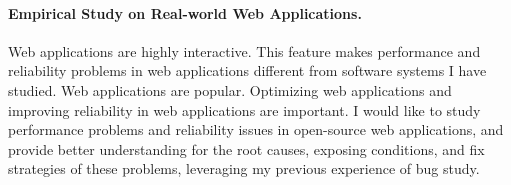 \documentclass[10pt]{article}
\begin{document}
\paragraph{Empirical Study on Real-world Web Applications.}
Web applications are highly interactive. 
This feature makes performance and reliability problems in web applications different from software systems I have studied. 
Web applications are popular. 
Optimizing web applications and improving reliability in web applications are important. 
I would like to study performance problems and reliability issues in open-source web applications, 
and provide better understanding for the root causes, 
exposing conditions, and fix strategies of these problems, 
leveraging my previous experience of bug study. 










\newpage


\end{document}
